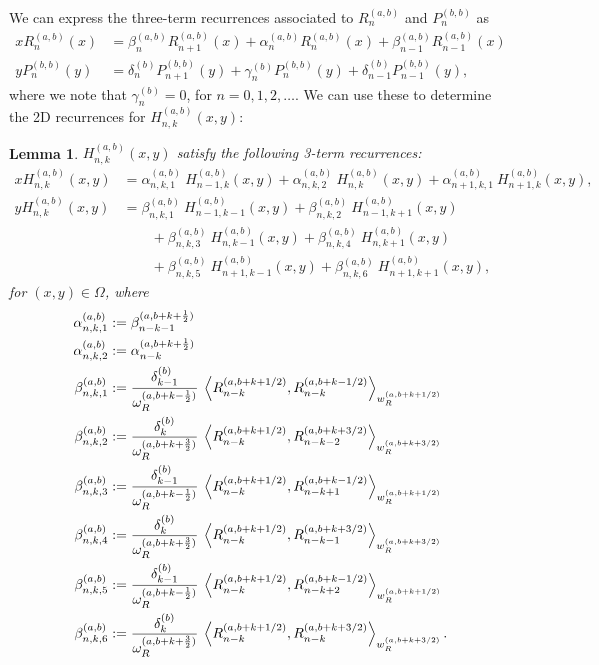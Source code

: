\documentclass[11pt, oneside]{article}   	%
\newcommand{\half}{\frac{1}{2}}
\newcommand{\hdop}{H}
\newcommand{\hdopnk}{\hdop_{n,k}}
\newcommand{\hdopnkab}{\hdop_{n,k}^{(a,b)}}
\newcommand{\alphaab}{\alpha^{(a,b)}}
\newcommand{\betaab}{\beta^{(a,b)}}
\newcommand{\genjac}{R}
\newcommand{\genjacnmk}{\genjac_{n-k}}
\newcommand{\genjacw}{w_\genjac}
\newcommand{\normgenjac}{\omega_\genjac}
\newtheorem{lemma}{Lemma}
\begin{document}
We can express the three-term recurrences associated to $\genjac_n^{(a,b)}$ and $P_n^{(b,b)}$ as
\begin{align}
x \genjac_n^{(a,b)}(x) &= \beta_n^{(a,b)} \genjac_{n+1}^{(a,b)}(x) + \alpha_n^{(a,b)} \genjac_n^{(a,b)}(x) + \beta_{n-1}^{(a,b)} \genjac_{n-1}^{(a,b)}(x) 
\label{eqn:Hrecurrence} \\
y P_n^{(b,b)}(y) &= \delta_n^{(b)} P_{n+1}^{(b,b)}(y) + \gamma_n^{(b)} P_n^{(b,b)}(y) + \delta_{n-1}^{(b)} P_{n-1}^{(b,b)}(y),
\end{align}
where we note that \(\gamma_n^{(b)} = 0\), for \( n = 0,1,2,\dots\). We can use these to determine the 2D recurrences for $\hdopnkab(x,y)$:

\begin{lemma}
$\hdopnk^{(a,b)}(x,y)$ satisfy the following 3-term recurrences:
\begin{align*}
x \hdopnk^{(a,b)}(x,y) &= \alphaab_{n,k,1} \: \hdop_{n-1, k}^{(a,b)}(x, y) + \alphaab_{n,k,2} \: \hdop_{n, k}^{(a,b)}(x, y) + \alphaab_{n+1,k,1} \: \hdop_{n+1, k}^{(a,b)}(x, y), \\
y \hdopnk^{(a,b)}(x,y) &= \betaab_{n,k,1} \: \hdop_{n-1, k-1}^{(a,b)}(x, y) + \betaab_{n,k,2} \: \hdop_{n-1, k+1}^{(a,b)}(x, y) \nonumber \\
		& \quad \quad + \betaab_{n,k,3} \: \hdop_{n, k-1}^{(a,b)}(x, y) + \betaab_{n,k,4} \: \hdop_{n, k+1}^{(a,b)}(x, y) \nonumber \\
		& \quad \quad + \betaab_{n,k,5} \: \hdop_{n+1, k-1}^{(a,b)}(x, y) + \betaab_{n,k,6} \: \hdop_{n+1, k+1}^{(a,b)}(x, y),
\end{align*}
for \((x,y) \in \Omega\), where
\begin{align*}
	\alphaab_{n,k,1} &:= \beta_{n-k-1}^{(a, b+k+\half)} \\
	\alphaab_{n,k,2} &:= \alpha_{n-k}^{(a, b+k+\half)} \\
	\betaab_{n,k,1} &:= \frac{\delta_{k-1}^{(b)}}{\normgenjac^{(a, b + k - \half)}} \: \ip<\genjacnmk^{(a, b+k+1/2)}, \genjacnmk^{(a, b+k-1/2)}>_{\genjacw^{(a, b+k+1/2)}} \\
	\betaab_{n,k,2} &:= \frac{\delta_{k}^{(b)}}{\normgenjac^{(a, b + k + \frac{3}{2})}} \: \ip<\genjacnmk^{(a, b+k+1/2)}, \genjac_{n-k-2}^{(a, b+k+{3/2})}>_{\genjacw^{(a, b+k+{3/2})}} \\
	\betaab_{n,k,3} &:= \frac{\delta_{k-1}^{(b)}}{\normgenjac^{(a, b + k - \half)}} \: \ip<\genjacnmk^{(a, b+k+1/2)}, \genjac_{n-k+1}^{(a, b+k-1/2)}>_{\genjacw^{(a, b+k+1/2)}} \\
	\betaab_{n,k,4} &:= \frac{\delta_{k}^{(b)}}{\normgenjac^{(a, b + k + \frac{3}{2})}} \: \ip<\genjacnmk^{(a, b+k+1/2)}, \genjac_{n-k-1}^{(a, b+k+{3/2})}>_{\genjacw^{(a, b+k+{3/2})}} \\
	\betaab_{n,k,5} &:= \frac{\delta_{k-1}^{(b)}}{\normgenjac^{(a, b + k - \half)}} \: \ip<\genjacnmk^{(a, b+k+1/2)}, \genjac_{n-k+2}^{(a, b+k-1/2)}>_{\genjacw^{(a, b+k+1/2)}} \\
	\betaab_{n,k,6} &:= \frac{\delta_{k}^{(b)}}{\normgenjac^{(a, b + k + \frac{3}{2})}} \: \ip<\genjacnmk^{(a, b+k+1/2)}, \genjacnmk^{(a, b+k+{3/2})}>_{\genjacw^{(a, b+k+{3/2})}}. 
\end{align*}

\end{lemma}
\end{document}
